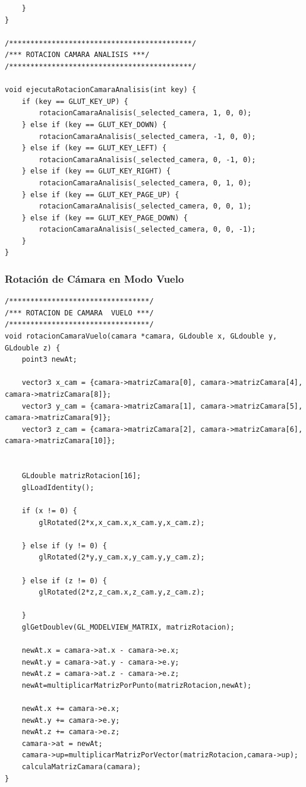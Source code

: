 \documentclass[12pt,a4paper]{article}
\begin{document}
\begin{lstlisting}
    }
}

/*******************************************/
/*** ROTACION CAMARA ANALISIS ***/
/*******************************************/

void ejecutaRotacionCamaraAnalisis(int key) {
    if (key == GLUT_KEY_UP) {
        rotacionCamaraAnalisis(_selected_camera, 1, 0, 0);
    } else if (key == GLUT_KEY_DOWN) {
        rotacionCamaraAnalisis(_selected_camera, -1, 0, 0);
    } else if (key == GLUT_KEY_LEFT) {
        rotacionCamaraAnalisis(_selected_camera, 0, -1, 0);
    } else if (key == GLUT_KEY_RIGHT) {
        rotacionCamaraAnalisis(_selected_camera, 0, 1, 0);
    } else if (key == GLUT_KEY_PAGE_UP) {
        rotacionCamaraAnalisis(_selected_camera, 0, 0, 1);
    } else if (key == GLUT_KEY_PAGE_DOWN) {
        rotacionCamaraAnalisis(_selected_camera, 0, 0, -1);
    }
}

\end{lstlisting}

\subsubsection{Rotación de Cámara en Modo Vuelo}

\begin{lstlisting}
/*********************************/
/*** ROTACION DE CAMARA  VUELO ***/
/*********************************/
void rotacionCamaraVuelo(camara *camara, GLdouble x, GLdouble y, GLdouble z) {
    point3 newAt;

    vector3 x_cam = {camara->matrizCamara[0], camara->matrizCamara[4], camara->matrizCamara[8]};
    vector3 y_cam = {camara->matrizCamara[1], camara->matrizCamara[5], camara->matrizCamara[9]};
    vector3 z_cam = {camara->matrizCamara[2], camara->matrizCamara[6], camara->matrizCamara[10]};


    GLdouble matrizRotacion[16];
    glLoadIdentity();

    if (x != 0) {
        glRotated(2*x,x_cam.x,x_cam.y,x_cam.z);

    } else if (y != 0) {
        glRotated(2*y,y_cam.x,y_cam.y,y_cam.z);

    } else if (z != 0) {
        glRotated(2*z,z_cam.x,z_cam.y,z_cam.z);

    }
    glGetDoublev(GL_MODELVIEW_MATRIX, matrizRotacion);

    newAt.x = camara->at.x - camara->e.x;
    newAt.y = camara->at.y - camara->e.y;
    newAt.z = camara->at.z - camara->e.z;
    newAt=multiplicarMatrizPorPunto(matrizRotacion,newAt);

    newAt.x += camara->e.x;
    newAt.y += camara->e.y;
    newAt.z += camara->e.z;
    camara->at = newAt;
    camara->up=multiplicarMatrizPorVector(matrizRotacion,camara->up);
    calculaMatrizCamara(camara);
}


\end{lstlisting}
\end{document}
